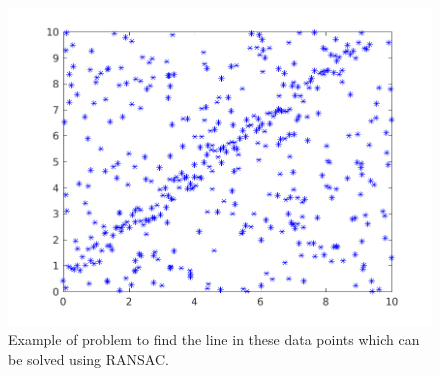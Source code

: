 \begin{figure}[H]
  \centering
  \includegraphics[width = .8\columnwidth]{../results/ransac.png}
  \caption{Example of problem to find the line in these data points which can be solved using RANSAC.}
  \label{fig:theory:stitching:ransac}
\end{figure}
